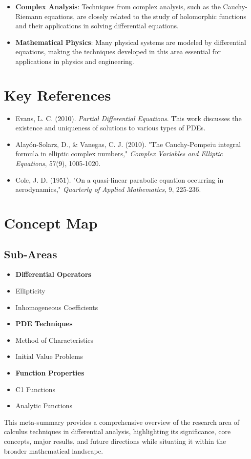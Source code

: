 \documentclass[11pt,a4paper]{article}
\begin{document}
\begin{itemize}
\item \textbf{Complex Analysis}: Techniques from complex analysis, such as the Cauchy-Riemann equations, are closely related to the study of holomorphic functions and their applications in solving differential equations.
\end{itemize}

\begin{itemize}
\item \textbf{Mathematical Physics}: Many physical systems are modeled by differential equations, making the techniques developed in this area essential for applications in physics and engineering.
\end{itemize}

\section{Key References}

\begin{itemize}
\item Evans, L. C. (2010). \textit{Partial Differential Equations}. This work discusses the existence and uniqueness of solutions to various types of PDEs.
\item Alayón-Solarz, D., & Vanegas, C. J. (2010). "The Cauchy-Pompeiu integral formula in elliptic complex numbers," \textit{Complex Variables and Elliptic Equations}, 57(9), 1005-1020.
\item Cole, J. D. (1951). "On a quasi-linear parabolic equation occurring in aerodynamics," \textit{Quarterly of Applied Mathematics}, 9, 225-236.
\end{itemize}

\section{Concept Map}

\subsection{Sub-Areas}
\begin{itemize}
\item \textbf{Differential Operators}
\item Ellipticity
\item Inhomogeneous Coefficients
\item \textbf{PDE Techniques}
\item Method of Characteristics
\item Initial Value Problems
\item \textbf{Function Properties}
\item C1 Functions
\item Analytic Functions
\end{itemize}

This meta-summary provides a comprehensive overview of the research area of calculus techniques in differential analysis, highlighting its significance, core concepts, major results, and future directions while situating it within the broader mathematical landscape.
\end{document}
